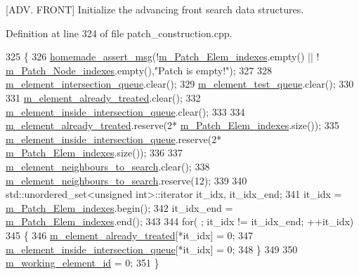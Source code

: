 \mbox{[}A\+D\+V. F\+R\+O\+N\+T\mbox{]} Initialize the advancing front search data structures. 



Definition at line 324 of file patch\+\_\+construction.\+cpp.


\begin{DoxyCode}
325 \{
326     \hyperlink{common__header_8h_a593ccc80b790b2268653fcf6597bf451}{homemade\_assert\_msg}(!\hyperlink{classcarl_1_1_patch__construction_af7db498027d46bff8464757e824404fb}{m\_Patch\_Elem\_indexes}.empty() || !
      \hyperlink{classcarl_1_1_patch__construction_a85fb959e6f57d935a8d6fe0d4f0f7f46}{m\_Patch\_Node\_indexes}.empty(),\textcolor{stringliteral}{"Patch is empty!"});
327 
328     \hyperlink{classcarl_1_1_patch__construction_afb05a2bad18a8c6fa0287ae44a246687}{m\_element\_intersection\_queue}.clear();
329     \hyperlink{classcarl_1_1_patch__construction_a4afa35f6be957a083ac586ae158b55dc}{m\_element\_test\_queue}.clear();
330 
331     \hyperlink{classcarl_1_1_patch__construction_a11aed0d9b1e61d152d02cf56e1690c53}{m\_element\_already\_treated}.clear();
332     \hyperlink{classcarl_1_1_patch__construction_a66d5ff525192d6aa53ea63beb95afd7d}{m\_element\_inside\_intersection\_queue}.clear();
333 
334     \hyperlink{classcarl_1_1_patch__construction_a11aed0d9b1e61d152d02cf56e1690c53}{m\_element\_already\_treated}.reserve(2*
      \hyperlink{classcarl_1_1_patch__construction_af7db498027d46bff8464757e824404fb}{m\_Patch\_Elem\_indexes}.size());
335     \hyperlink{classcarl_1_1_patch__construction_a66d5ff525192d6aa53ea63beb95afd7d}{m\_element\_inside\_intersection\_queue}.reserve(2*
      \hyperlink{classcarl_1_1_patch__construction_af7db498027d46bff8464757e824404fb}{m\_Patch\_Elem\_indexes}.size());
336 
337     \hyperlink{classcarl_1_1_patch__construction_a73186b0129fff50276de0c1eabd5ea0d}{m\_element\_neighbours\_to\_search}.clear();
338     \hyperlink{classcarl_1_1_patch__construction_a73186b0129fff50276de0c1eabd5ea0d}{m\_element\_neighbours\_to\_search}.reserve(12);
339 
340     std::unordered\_set<unsigned int>::iterator it\_idx, it\_idx\_end;
341     it\_idx      = \hyperlink{classcarl_1_1_patch__construction_af7db498027d46bff8464757e824404fb}{m\_Patch\_Elem\_indexes}.begin();
342     it\_idx\_end  = \hyperlink{classcarl_1_1_patch__construction_af7db498027d46bff8464757e824404fb}{m\_Patch\_Elem\_indexes}.end();
343 
344     \textcolor{keywordflow}{for}( ; it\_idx != it\_idx\_end; ++it\_idx)
345     \{
346         \hyperlink{classcarl_1_1_patch__construction_a11aed0d9b1e61d152d02cf56e1690c53}{m\_element\_already\_treated}[*it\_idx] = 0;
347         \hyperlink{classcarl_1_1_patch__construction_a66d5ff525192d6aa53ea63beb95afd7d}{m\_element\_inside\_intersection\_queue}[*it\_idx] = 0;
348     \}
349 
350     \hyperlink{classcarl_1_1_patch__construction_a7889a62e6717124c405bc508b03f3254}{m\_working\_element\_id} = 0;
351 \}
\end{DoxyCode}
